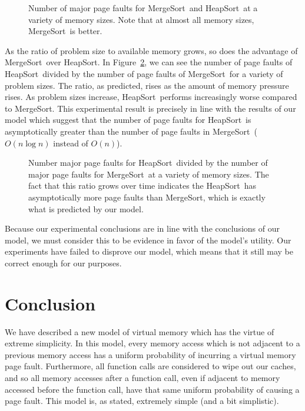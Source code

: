 \documentclass{acmtrans2m}
\newcommand{\heapsort}{{\sc HeapSort}}
\newcommand{\mergesort}{{\sc MergeSort}}
\begin{document}
\begin{figure}

\caption{Number of major page faults for \mergesort\ and \heapsort\ at a variety of memory sizes.  Note that at almost all memory sizes, \mergesort\ is better.}
\label{fig:sizes}
\end{figure}

As the ratio of problem size to available memory grows, so does the advantage
of \mergesort\ over \heapsort.  In Figure~\ref{fig:ratio}, we can see the
number of page faults of \heapsort\ divided by the number of page faults of
\mergesort\ for a variety of problem sizes.  The ratio, as predicted, rises as
the amount of memory pressure rises.  As problem sizes increase, \heapsort\
performs increasingly worse compared to \mergesort. This experimental result is
precisely in line with the results of our model which suggest that the number of page faults for \heapsort\ is asymptotically greater than the number of page faults in \mergesort\ ($O(n \log n)$ instead of $O(n)$).

\begin{figure}

\caption{Number major page faults for \heapsort\ divided by the number of major page faults for \mergesort\ at a variety of memory sizes.  The fact that this ratio grows over time indicates the \heapsort\ has asymptotically more page faults than \mergesort, which is exactly what is predicted by our model.}
\label{fig:ratio}
\end{figure}

Because our experimental conclusions are in line with the conclusions of our
model, we must consider this to be evidence in favor of the model's utility.
Our experiments have failed to disprove our model, which means that it still
may be correct enough for our purposes.

\section{Conclusion}

We have described a new model of virtual memory which has the virtue of extreme
simplicity.  In this model, every memory access which is not adjacent to a previous memory access has a uniform probability of incurring a virtual memory page fault.  Furthermore, all function calls are considered to wipe out our caches, and so all memory accesses after a function call, even if adjacent to memory accessed before the function call, have that same uniform probability of causing a page fault.  This model is, as stated, extremely simple (and a bit simplistic).
\end{document}
